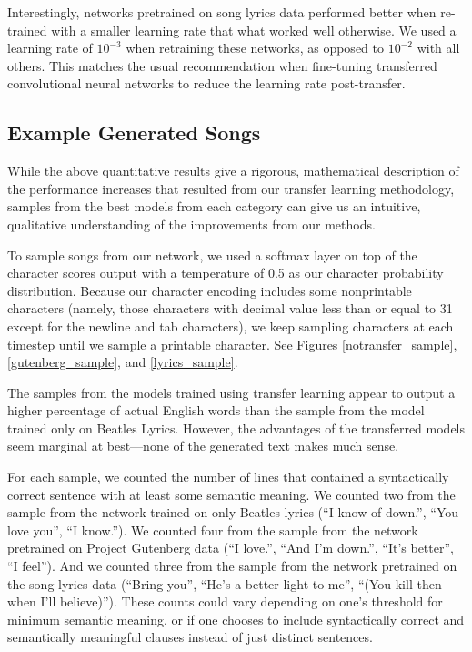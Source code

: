 \documentclass[10pt,twocolumn,letterpaper]{article}
\begin{document}
	Interestingly, networks pretrained on song lyrics data performed better when re-trained with a smaller learning rate that what worked well otherwise. We used a learning rate of $10^{-3}$ when retraining these networks, as opposed to $10^{-2}$ with all others. This matches the usual recommendation when fine-tuning transferred convolutional neural networks to reduce the learning rate post-transfer.
	
	\subsection{Example Generated Songs}
		While the above quantitative results give a rigorous, mathematical description of the performance increases that resulted from our transfer learning methodology, samples from the best models from each category can give us an intuitive, qualitative understanding of the improvements from our methods.
		
		To sample songs from our network, we used a softmax layer on top of the character scores output with a temperature of 0.5 as our character probability distribution. Because our character encoding includes some nonprintable characters (namely, those characters with decimal value less than or equal to 31 except for the newline and tab characters), we keep sampling characters at each timestep until we sample a printable character. See Figures \ref{notransfer_sample}, \ref{gutenberg_sample}, and \ref{lyrics_sample}.
		
		The samples from the models trained using transfer learning appear to output a higher percentage of actual English words than the sample from the model trained only on Beatles Lyrics. However, the advantages of the transferred models seem marginal at best---none of the generated text makes much sense.
		
		For each sample, we counted the number of lines that contained a syntactically correct sentence with at least some semantic meaning. We counted two from the sample from the network trained on only Beatles lyrics (``I know of down.'', ``You love you'', ``I know.''). We counted four from the sample from the network pretrained on Project Gutenberg data (``I love.'', ``And I'm down.'', ``It's better'', ``I feel''). And we counted three from the sample from the network pretrained on the song lyrics data (``Bring you'', ``He's a better light to me'', ``(You kill then when I'll believe)''). These counts could vary depending on one's threshold for minimum semantic meaning, or if one chooses to include syntactically correct and semantically meaningful clauses instead of just distinct sentences.
		
\end{document}
